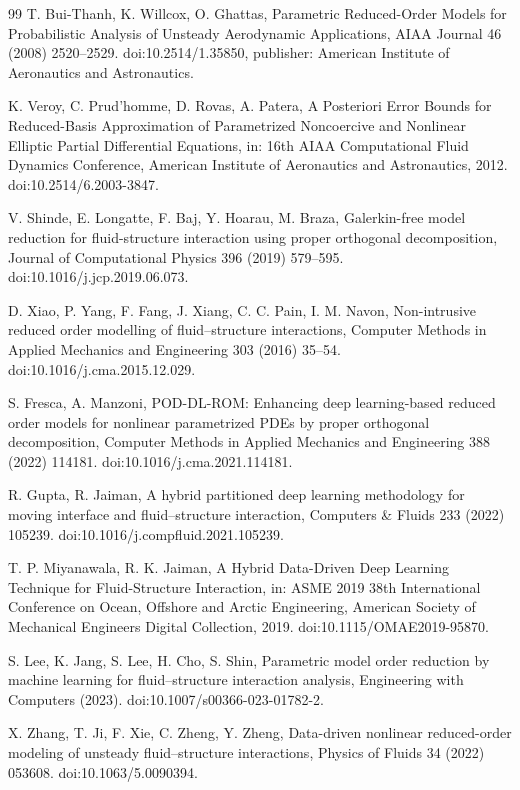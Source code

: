 \documentclass[11pt]{article}
\begin{document}
\begin{thebibliography}{99}
T. Bui-Thanh, K. Willcox, O. Ghattas, Parametric Reduced-Order Models for Probabilistic Analysis of Unsteady Aerodynamic Applications, AIAA Journal 46 (2008) 2520--2529. doi:10.2514/1.35850, publisher: American Institute of Aeronautics and Astronautics.

K. Veroy, C. Prud'homme, D. Rovas, A. Patera, A Posteriori Error Bounds for Reduced-Basis Approximation of Parametrized Noncoercive and Nonlinear Elliptic Partial Differential Equations, in: 16th AIAA Computational Fluid Dynamics Conference, American Institute of Aeronautics and Astronautics, 2012. doi:10.2514/6.2003-3847.

V. Shinde, E. Longatte, F. Baj, Y. Hoarau, M. Braza, Galerkin-free model reduction for fluid-structure interaction using proper orthogonal decomposition, Journal of Computational Physics 396 (2019) 579--595. doi:10.1016/j.jcp.2019.06.073.

D. Xiao, P. Yang, F. Fang, J. Xiang, C. C. Pain, I. M. Navon, Non-intrusive reduced order modelling of fluid--structure interactions, Computer Methods in Applied Mechanics and Engineering 303 (2016) 35--54. doi:10.1016/j.cma.2015.12.029.

S. Fresca, A. Manzoni, POD-DL-ROM: Enhancing deep learning-based reduced order models for nonlinear parametrized PDEs by proper orthogonal decomposition, Computer Methods in Applied Mechanics and Engineering 388 (2022) 114181. doi:10.1016/j.cma.2021.114181.

R. Gupta, R. Jaiman, A hybrid partitioned deep learning methodology for moving interface and fluid--structure interaction, Computers \& Fluids 233 (2022) 105239. doi:10.1016/j.compfluid.2021.105239.

T. P. Miyanawala, R. K. Jaiman, A Hybrid Data-Driven Deep Learning Technique for Fluid-Structure Interaction, in: ASME 2019 38th International Conference on Ocean, Offshore and Arctic Engineering, American Society of Mechanical Engineers Digital Collection, 2019. doi:10.1115/OMAE2019-95870.

S. Lee, K. Jang, S. Lee, H. Cho, S. Shin, Parametric model order reduction by machine learning for fluid--structure interaction analysis, Engineering with Computers (2023). doi:10.1007/s00366-023-01782-2.

X. Zhang, T. Ji, F. Xie, C. Zheng, Y. Zheng, Data-driven nonlinear reduced-order modeling of unsteady fluid--structure interactions, Physics of Fluids 34 (2022) 053608. doi:10.1063/5.0090394.


\end{thebibliography}
\end{document}
